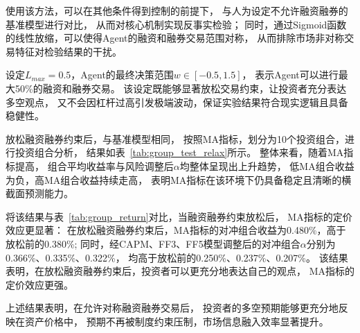 使用该方法，可以在其他条件得到控制的前提下，
与人为设定不允许融资融券的基准模型进行对比，
从而对核心机制实现反事实检验；
同时，通过Sigmoid函数的线性放缩，可以使得Agent的融资和融券交易范围对称，
从而排除市场非对称交易特征对检验结果的干扰。

设定$L_{max} = 0.5$，Agent的最终决策范围$w \in [-0.5, 1.5]$，
表示Agent可以进行最大50\%的融资和融券交易。
该设定既能够显著放松交易约束，让投资者充分表达多空观点，
又不会因杠杆过高引发极端波动，保证实验结果符合现实逻辑且具备稳健性。

放松融资融券约束后，与基准模型相同，
按照MA指标，划分为10个投资组合，进行投资组合分析，
结果如表~\ref{tab:group_test_relax}所示。
整体来看，随着MA指标提高，
组合平均收益率与风险调整后$\alpha$均整体呈现出上升趋势，
低MA组合收益为负，高MA组合收益持续走高，
表明MA指标在该环境下仍具备稳定且清晰的横截面预测能力。

将该结果与表~\ref{tab:group_return}对比，当融资融券约束放松后，
MA指标的定价效应更显著：
在放松融资融券约束后，MA指标的对冲组合收益为0.480\%，高于放松前的0.380\%;
同时，经CAPM、FF3、FF5模型调整后的对冲组合$\alpha$分别为0.366\%、0.335\%、0.322\%，
均高于放松前的0.250\%、0.237\%、0.207\%。
该结果表明，在放松融资融券约束后，投资者可以更充分地表达自己的观点，
MA指标的定价效应更强。

上述结果表明，在允许对称融资融券交易后，
投资者的多空预期能够更充分地反映在资产价格中，
预期不再被制度约束压制，市场信息融入效率显著提升。

